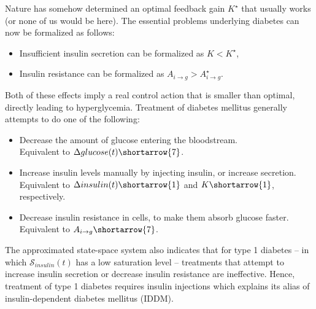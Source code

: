 Nature has somehow determined an optimal feedback gain $K^\star$ that usually works (or none of us would be here). The essential problems underlying diabetes can now be formalized as follows:
\begin{itemize}
\item Insufficient insulin secretion can be formalized as $K < K^\star$,
\item Insulin resistance can be formalized as $A_{i\rightarrow g} > A_{i\rightarrow g}^\star$.
\end{itemize}
Both of these effects imply a real control action that is smaller than optimal, directly leading to hyperglycemia. Treatment of diabetes mellitus generally attempts to do one of the following:
\begin{itemize}
\item   Decrease the amount of glucose entering the bloodstream.\\ 
        Equivalent to $\Delta glucose(t)\shortarrow{7}$.
\item   Increase insulin levels manually by injecting insulin, or increase secretion. \\ 
        Equivalent to $\Delta insulin(t)\shortarrow{1}$ and $K\shortarrow{1}$, respectively.
\item   Decrease insulin resistance in cells, to make them absorb glucose faster.\\ 
        Equivalent to $A_{i\rightarrow g}\shortarrow{7}$.
\end{itemize}

The approximated state-space system also indicates that for type 1 diabetes -- in which $\mathcal{S}_{insulin}(t)$ has a low saturation level -- treatments that attempt to increase insulin secretion or decrease insulin resistance are ineffective. Hence, treatment of type 1 diabetes requires insulin injections which explains its alias of insulin-dependent diabetes mellitus (IDDM).
\fi













\cleardoublepage

